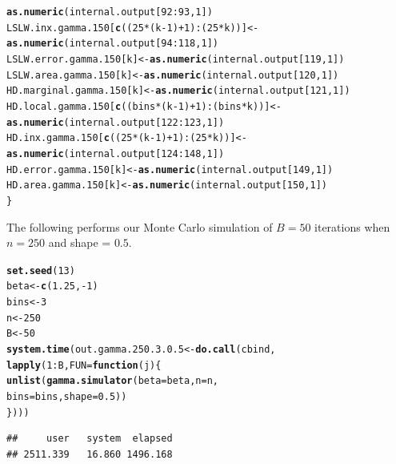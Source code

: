 \documentclass[11pt]{article}\usepackage[]{graphicx}\usepackage[]{color}
\makeatletter
\newcommand{\hlnum}[1]{\textcolor[rgb]{0.686,0.059,0.569}{#1}}%
\newcommand{\hlopt}[1]{\textcolor[rgb]{0,0,0}{#1}}%
\newcommand{\hlstd}[1]{\textcolor[rgb]{0.345,0.345,0.345}{#1}}%
\newcommand{\hlkwa}[1]{\textcolor[rgb]{0.161,0.373,0.58}{\textbf{#1}}}%
\newcommand{\hlkwb}[1]{\textcolor[rgb]{0.69,0.353,0.396}{#1}}%
\newcommand{\hlkwc}[1]{\textcolor[rgb]{0.333,0.667,0.333}{#1}}%
\newcommand{\hlkwd}[1]{\textcolor[rgb]{0.737,0.353,0.396}{\textbf{#1}}}%
\newenvironment{kframe}{%
 \def\at@end@of@kframe{}%
 \ifinner\ifhmode%
  \def\at@end@of@kframe{\end{minipage}}%
  \begin{minipage}{\columnwidth}%
 \fi\fi%
 \def\FrameCommand##1{\hskip\@totalleftmargin \hskip-\fboxsep
 \colorbox{shadecolor}{##1}\hskip-\fboxsep
     \hskip-\linewidth \hskip-\@totalleftmargin \hskip\columnwidth}%
 \MakeFramed {\advance\hsize-\width
   \@totalleftmargin\z@ \linewidth\hsize
   \@setminipage}}%
 {\par\unskip\endMakeFramed%
 \at@end@of@kframe}
\newenvironment{knitrout}{}{} %
\makeatother
\begin{document}
\begin{knitrout}
\begin{kframe}
\begin{alltt}
    \hlkwd{as.numeric}\hlstd{(internal.output[}\hlnum{92}\hlopt{:}\hlnum{93}\hlstd{,} \hlnum{1}\hlstd{])}
  \hlstd{LSLW.inx.gamma.150[}\hlkwd{c}\hlstd{((}\hlnum{25}\hlopt{*}\hlstd{(k}\hlopt{-}\hlnum{1}\hlstd{)}\hlopt{+}\hlnum{1}\hlstd{)}\hlopt{:}\hlstd{(}\hlnum{25}\hlopt{*}\hlstd{k))]} \hlkwb{<-}
    \hlkwd{as.numeric}\hlstd{(internal.output[}\hlnum{94}\hlopt{:}\hlnum{118}\hlstd{,} \hlnum{1}\hlstd{])}
  \hlstd{LSLW.error.gamma.150[k]} \hlkwb{<-} \hlkwd{as.numeric}\hlstd{(internal.output[}\hlnum{119}\hlstd{,} \hlnum{1}\hlstd{])}
  \hlstd{LSLW.area.gamma.150[k]} \hlkwb{<-} \hlkwd{as.numeric}\hlstd{(internal.output[}\hlnum{120}\hlstd{,} \hlnum{1}\hlstd{])}
  \hlstd{HD.marginal.gamma.150[k]} \hlkwb{<-} \hlkwd{as.numeric}\hlstd{(internal.output[}\hlnum{121}\hlstd{,} \hlnum{1}\hlstd{])}
  \hlstd{HD.local.gamma.150[}\hlkwd{c}\hlstd{((bins}\hlopt{*}\hlstd{(k}\hlopt{-}\hlnum{1}\hlstd{)}\hlopt{+}\hlnum{1}\hlstd{)}\hlopt{:}\hlstd{(bins}\hlopt{*}\hlstd{k))]} \hlkwb{<-}
    \hlkwd{as.numeric}\hlstd{(internal.output[}\hlnum{122}\hlopt{:}\hlnum{123}\hlstd{,} \hlnum{1}\hlstd{])}
  \hlstd{HD.inx.gamma.150[}\hlkwd{c}\hlstd{((}\hlnum{25}\hlopt{*}\hlstd{(k}\hlopt{-}\hlnum{1}\hlstd{)}\hlopt{+}\hlnum{1}\hlstd{)}\hlopt{:}\hlstd{(}\hlnum{25}\hlopt{*}\hlstd{k))]} \hlkwb{<-}
    \hlkwd{as.numeric}\hlstd{(internal.output[}\hlnum{124}\hlopt{:}\hlnum{148}\hlstd{,} \hlnum{1}\hlstd{])}
  \hlstd{HD.error.gamma.150[k]} \hlkwb{<-} \hlkwd{as.numeric}\hlstd{(internal.output[}\hlnum{149}\hlstd{,} \hlnum{1}\hlstd{])}
  \hlstd{HD.area.gamma.150[k]} \hlkwb{<-} \hlkwd{as.numeric}\hlstd{(internal.output[}\hlnum{150}\hlstd{,} \hlnum{1}\hlstd{])}
\hlstd{\}}
\end{alltt}
\end{kframe}
\end{knitrout}


The following performs our Monte Carlo simulation of $B = 50$ iterations 
when $n = 250$ and shape = $0.5$.

\begin{knitrout}
\color{fgcolor}\begin{kframe}
\begin{alltt}
\hlkwd{set.seed}\hlstd{(}\hlnum{13}\hlstd{)}
\hlstd{beta} \hlkwb{<-} \hlkwd{c}\hlstd{(}\hlnum{1.25}\hlstd{,} \hlopt{-}\hlnum{1}\hlstd{)}
\hlstd{bins} \hlkwb{<-} \hlnum{3}
\hlstd{n} \hlkwb{<-} \hlnum{250}
\hlstd{B} \hlkwb{<-} \hlnum{50}
\hlkwd{system.time}\hlstd{(out.gamma.250.3.0.5} \hlkwb{<-} \hlkwd{do.call}\hlstd{(cbind,}
  \hlkwd{lapply}\hlstd{(}\hlnum{1}\hlopt{:}\hlstd{B,} \hlkwc{FUN} \hlstd{=} \hlkwa{function}\hlstd{(}\hlkwc{j}\hlstd{)\{}
    \hlkwd{unlist}\hlstd{(}\hlkwd{gamma.simulator}\hlstd{(}\hlkwc{beta} \hlstd{= beta,} \hlkwc{n} \hlstd{= n,}
      \hlkwc{bins} \hlstd{= bins,} \hlkwc{shape} \hlstd{=} \hlnum{0.5}\hlstd{))}
\hlstd{\})))}
\end{alltt}
\begin{verbatim}
##     user   system  elapsed 
## 2511.339   16.860 1496.168
\end{verbatim}
\end{kframe}
\end{knitrout}
\end{document}
